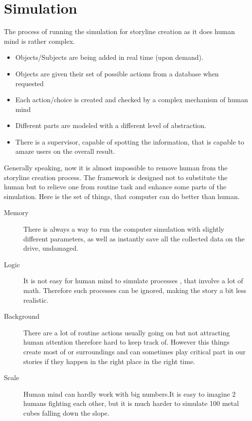 \section{Simulation}

The process of running the simulation for storyline creation as it does human mind is rather complex.
\begin{itemize}
 \item Objects/Subjects are being added in real time (upon demand).
 \item Objects are given their set of possible actions from a database when requested
 \item Each action/choice is created and checked by a complex mechanism of human mind
 \item Different parts are modeled with a different level of abstraction.
 \item There is a supervisor, capable of spotting the information, that is capable to amaze users on the overall result.
\end{itemize}

Generally speaking, now it is almost impossible to remove human from the storyline creation process. The framework is designed not to substitute the human but to relieve one from routine task and enhance some parts of the simulation. Here is the set of things, that computer can do better than human.
\begin{description}
 \item[Memory] There is always a way to run the computer simulation with slightly different parameters, as well as instantly save all the collected data on the drive, undamaged.
 \item[Logic] It is not easy for human mind to simulate processes , that involve a lot of math. Therefore such processes can be ignored, making the story a bit less realistic.
 \item[Background]There are a lot of routine actions usually going on but not attracting human attention therefore hard to keep track of. However this things create most of or surroundings and can sometimes play critical part in our stories if they happen in the right place in the right time.
 \item[Scale] Human mind can hardly work with big numbers.It is easy to imagine 2 humans fighting each other, but it is much harder to simulate 100 metal cubes falling down the slope.
\end{description}
\par
